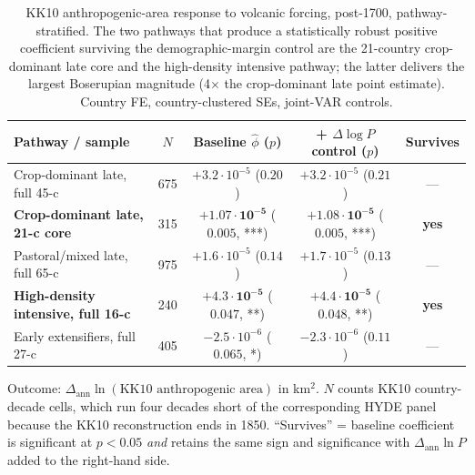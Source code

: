 \documentclass[11pt,letterpaper]{article}
\begin{document}
\begin{table}[H]
\centering
\caption{KK10 anthropogenic-area response to volcanic forcing, post-1700, pathway-stratified. The two pathways that produce a statistically robust positive coefficient surviving the demographic-margin control are the 21-country crop-dominant late core and the high-density intensive pathway; the latter delivers the largest Boserupian magnitude (4$\times$ the crop-dominant late point estimate). Country FE, country-clustered SEs, joint-VAR controls.}
\label{tab:kk10-pathways}
\small
\begin{tabular}{lcccc}
\toprule
Pathway / sample & $N$ & Baseline $\hat\phi$ ($p$) & + $\Delta \log P$ control ($p$) & Survives \\
\midrule
Crop-dominant late, full 45-c               & 675 & $+3.2\!\cdot\!10^{-5}$ ($0.20$)              & $+3.2\!\cdot\!10^{-5}$ ($0.21$) & ---  \\
\textbf{Crop-dominant late, 21-c core}      & 315 & $\mathbf{+1.07\!\cdot\!10^{-5}}$ ($0.005$, ***) & $\mathbf{+1.08\!\cdot\!10^{-5}}$ ($0.005$, ***) & \textbf{yes} \\
Pastoral/mixed late, full 65-c              & 975 & $+1.6\!\cdot\!10^{-5}$ ($0.14$)              & $+1.7\!\cdot\!10^{-5}$ ($0.13$) & ---  \\
\textbf{High-density intensive, full 16-c}  & 240 & $\mathbf{+4.3\!\cdot\!10^{-5}}$ ($0.047$, **) & $\mathbf{+4.4\!\cdot\!10^{-5}}$ ($0.048$, **) & \textbf{yes} \\
Early extensifiers, full 27-c               & 405 & $-2.5\!\cdot\!10^{-6}$ ($0.065$, *)          & $-2.3\!\cdot\!10^{-6}$ ($0.11$) & ---  \\
\bottomrule
\end{tabular}
\par\smallskip\footnotesize{Outcome: $\Delta_{\text{ann}} \ln (\text{KK10 anthropogenic area})$ in km$^2$. $N$ counts KK10 country-decade cells, which run four decades short of the corresponding HYDE panel because the KK10 reconstruction ends in 1850. ``Survives'' = baseline coefficient is significant at $p < 0.05$ \emph{and} retains the same sign and significance with $\Delta_{\text{ann}} \ln P$ added to the right-hand side.}
\end{table}
\end{document}
